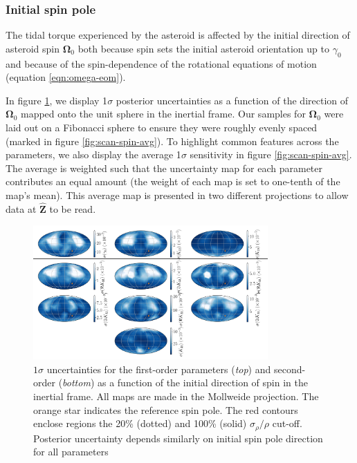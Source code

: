 \documentclass[fleqn,usenatbib]{mnras}
\newcommand{\unit}[1]{\bm{\hat{#1}}}
\begin{document}
\subsubsection{Initial spin pole}
\label{sec:scan-spin}

The tidal torque experienced by the asteroid is affected by the initial direction of asteroid spin $\bm \Omega_0$ both because spin sets the initial asteroid orientation up to $\gamma_0$ and because of the spin-dependence of the rotational equations of motion (equation \ref{eqn:omega-eom}).

In figure \ref{fig:scan-spin}, we display 1$\sigma$ posterior uncertainties as a function of the direction of $\bm \Omega_0$ mapped onto the unit sphere in the inertial frame. Our samples for $\bm \Omega_0$ were laid out on a Fibonacci sphere to ensure they were roughly evenly spaced (marked in figure \ref{fig:scan-spin-avg}). To highlight common features across the parameters, we also display the average 1$\sigma$ sensitivity in figure \ref{fig:scan-spin-avg}. The average is weighted such that the uncertainty map for each parameter contributes an equal amount (the weight of each map is set to one-tenth of the map's mean). This average map is presented in two different projections to allow data at $\unit Z$ to be read.

\begin{figure}
  \centering
  \includegraphics[width=0.8\textwidth]{figs/spin-pole.png}
  \caption{$1\sigma$ uncertainties for the first-order parameters (\textit{top}) and second-order (\textit{bottom}) as a function of the initial direction of spin in the inertial frame. All maps are made in the Mollweide projection. The orange star indicates the reference spin pole. The red contours enclose regions the 20\% (dotted) and 100\% (solid) $\sigma_\rho / \rho$ cut-off. Posterior uncertainty depends similarly on initial spin pole direction for all parameters}
  \label{fig:scan-spin}
\end{figure}
\end{document}
